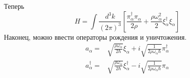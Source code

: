 \documentclass{article}
\begin{document}
Теперь
\begin{equation}
    H = \int \frac{d^3 k}{(2\pi)^3} \left[ \frac{\pi_\alpha^\dagger \pi_\alpha}{2\rho} + 
                         \frac{\rho \omega_\alpha^2}{2} \xi_\alpha^\dagger \xi_\alpha
                                        \right]
\end{equation}
Наконец, можно ввести операторы рождения и уничтожения.
\begin{equation}
    \begin{split}
        a_{\alpha} = & \sqrt{\frac{\rho \omega_\alpha}{2\hbar}}\xi_\alpha + 
                        i\sqrt{\frac{1}{2\rho\omega_\alpha \hbar}}\pi_\alpha^\dagger\\
        a_{\alpha}^\dagger = & \sqrt{\frac{\rho \omega_\alpha}{2\hbar}}\xi_\alpha^\dagger - 
                        i\sqrt{\frac{1}{2\rho\omega_\alpha \hbar}}\pi_\alpha\\
    \end{split}
\end{equation}
\end{document}
